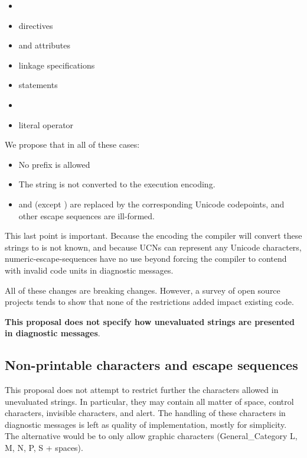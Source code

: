 \documentclass{wg21}
\begin{document}
\begin{itemize}
\item {}
\item {} directives
\item \tcode{[[nodiscard]]} and \tcode{[[deprecated]]} attributes
\item {} linkage specifications
\item {} statements
\item {}
\item literal operator
\end{itemize}

We propose that in all of these cases:
\begin{itemize}
\item No prefix is allowed
\item The string is not converted to the execution encoding.
\item {} and  (except  ) are replaced by
the corresponding Unicode codepoints, and other escape sequences are ill-formed.
\end{itemize}

This last point is important. Because the encoding the compiler will convert these strings to is not known, and because UCNs can represent any Unicode characters,
numeric-escape-sequences have no use beyond forcing the compiler to contend with invalid
code units in diagnostic messages.

All of these changes are breaking changes.
However, a survey of open source projects tends to show that none of the restrictions added
impact existing code.

\textbf{This proposal does not specify how unevaluated strings are presented in diagnostic messages}.

\subsection{Non-printable characters and escape sequences}

This proposal does not attempt to restrict further the characters allowed in unevaluated strings.
In particular, they may contain all matter of space, control characters, invisible characters, and alert.
The handling of these characters in diagnostic messages is left as quality of implementation, mostly
for simplicity. The alternative would be to only allow graphic characters (General_Category L, M, N, P, S + spaces).
\end{document}
